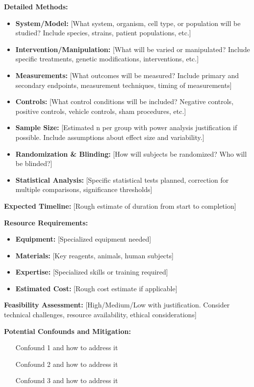\documentclass[11pt,letterpaper]{article}
\begin{document}
\textbf{Detailed Methods:}
\begin{itemize}
  \item \textbf{System/Model:} [What system, organism, cell type, or population will be studied? Include species, strains, patient populations, etc.]
  \item \textbf{Intervention/Manipulation:} [What will be varied or manipulated? Include specific treatments, genetic modifications, interventions, etc.]
  \item \textbf{Measurements:} [What outcomes will be measured? Include primary and secondary endpoints, measurement techniques, timing of measurements]
  \item \textbf{Controls:} [What control conditions will be included? Negative controls, positive controls, vehicle controls, sham procedures, etc.]
  \item \textbf{Sample Size:} [Estimated n per group with power analysis justification if possible. Include assumptions about effect size and variability.]
  \item \textbf{Randomization \& Blinding:} [How will subjects be randomized? Who will be blinded?]
  \item \textbf{Statistical Analysis:} [Specific statistical tests planned, correction for multiple comparisons, significance thresholds]
\end{itemize}

\textbf{Expected Timeline:} [Rough estimate of duration from start to completion]

\textbf{Resource Requirements:}
\begin{itemize}
  \item \textbf{Equipment:} [Specialized equipment needed]
  \item \textbf{Materials:} [Key reagents, animals, human subjects]
  \item \textbf{Expertise:} [Specialized skills or training required]
  \item \textbf{Estimated Cost:} [Rough cost estimate if applicable]
\end{itemize}

\textbf{Feasibility Assessment:} [High/Medium/Low with justification. Consider technical challenges, resource availability, ethical considerations]

\textbf{Potential Confounds and Mitigation:}
\begin{itemize}
  \item [Confound 1 and how to address it]
  \item [Confound 2 and how to address it]
  \item [Confound 3 and how to address it]
\end{itemize}
\end{document}
